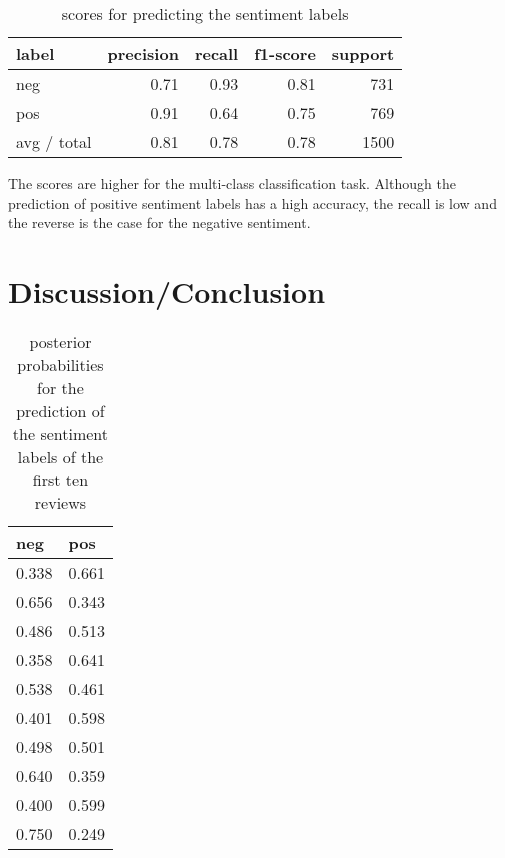 \documentclass[11pt]{article}
\begin{document}
\begin{table}[h]
\begin{tabular}{ l r r r r }
label & precision & recall & f1-score & support \\
\hline
neg & 0.71 & 0.93 & 0.81 & 731 \\
pos & 0.91 & 0.64 & 0.75 & 769 \\
\hline
avg / total & 0.81 & 0.78 & 0.78 & 1500
\end{tabular}
\caption{scores for predicting the sentiment labels}
\end{table}

The scores are higher for the multi-class classification task. Although the prediction of positive sentiment labels has a high accuracy, the recall is low and the reverse is the case for the negative sentiment.

\section{Discussion/Conclusion}

\begin{table}[h]
\begin{tabular}{ l l }
neg & pos \\
\hline
0.338 & 0.661 \\
0.656 & 0.343 \\
0.486 & 0.513 \\
0.358 & 0.641 \\
0.538 & 0.461 \\
0.401 & 0.598 \\
0.498 & 0.501 \\
0.640 & 0.359 \\
0.400 & 0.599 \\
0.750 & 0.249 \\
\end{tabular}
\caption{posterior probabilities for the prediction of the sentiment labels of the first ten reviews}
\end{table}
\end{document}
